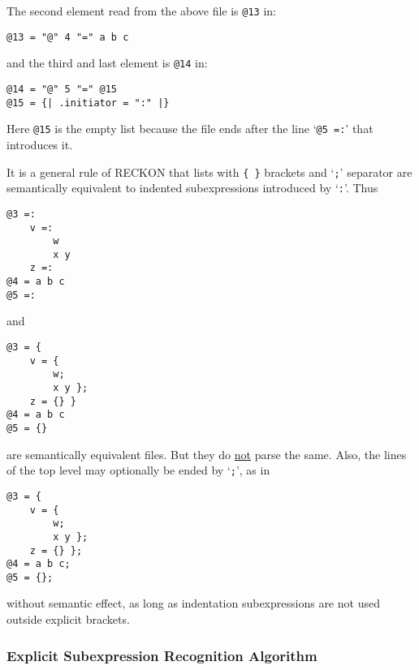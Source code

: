 \documentclass[12pt]{article}
\newenvironment{indpar}[1][0.3in]%
	{\begin{list}{}%
		     {\setlength{\itemsep}{0in}%
		      \setlength{\topsep}{0in}%
		      \setlength{\parsep}{1ex}%
		      \setlength{\labelwidth}{#1}%
		      \setlength{\leftmargin}{#1}%
		      \addtolength{\leftmargin}{\labelsep}}%
	 \item}%
	{\end{list}}
\begin{document}
The second element read from the above file is \verb|@13| in:

\begin{indpar}\begin{verbatim}
@13 = "@" 4 "=" a b c
\end{verbatim}\end{indpar}

and the third and last element is \verb|@14| in:

\begin{indpar}\begin{verbatim}
@14 = "@" 5 "=" @15
@15 = {| .initiator = ":" |}
\end{verbatim}\end{indpar}

Here \verb|@15| is the empty list because the file ends
after the line `\verb|@5 =:|' that introduces it.

It is a general rule\label{INDENTATION-EQUIVALENCE-RULE}
of RECKON that lists with \verb|{ }| brackets
and `\verb|;|' separator are semantically equivalent to indented
subexpressions introduced by `\verb|:|'.  Thus

\begin{indpar}\begin{verbatim}
@3 =:
    v =:
        w
        x y
    z =:
@4 = a b c
@5 =:
\end{verbatim}\end{indpar}

and

\begin{indpar}\begin{verbatim}
@3 = {
    v = {
        w;
        x y };
    z = {} }
@4 = a b c
@5 = {}
\end{verbatim}\end{indpar}

are semantically equivalent files.  But they do \underline{not}
parse the same.  Also, the lines of the top level may optionally
be ended by `\verb|;|', as in

\begin{indpar}\begin{verbatim}
@3 = {
    v = {
        w;
        x y };
    z = {} };
@4 = a b c;
@5 = {};
\end{verbatim}\end{indpar}

without semantic effect, as long as indentation subexpressions
are not used outside explicit brackets.

\subsubsection{Explicit Subexpression Recognition Algorithm}
\label{EXPLICIT-SUBEXPRESSION-RECOGNITION-ALGORITHM}
\end{document}
